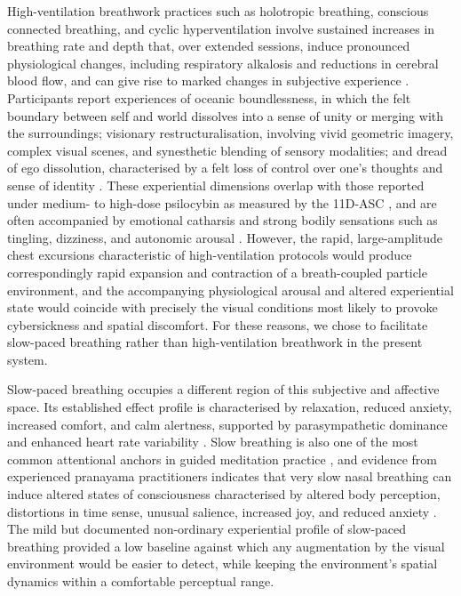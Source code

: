 High-ventilation breathwork practices such as holotropic breathing, conscious connected breathing, and cyclic hyperventilation involve sustained increases in breathing rate and depth that, over extended sessions, induce pronounced physiological changes, including respiratory alkalosis and reductions in cerebral blood flow, and can give rise to marked changes in subjective experience \citep{lewis2024breathwork, Kartar2025, fincham2024effects}. Participants report experiences of oceanic boundlessness, in which the felt boundary between self and world dissolves into a sense of unity or merging with the surroundings; visionary restructuralisation, involving vivid geometric imagery, complex visual scenes, and synesthetic blending of sensory modalities; and dread of ego dissolution, characterised by a felt loss of control over one's thoughts and sense of identity \citep{bahi2024effects, havenith2025decreased, lewis2024breathwork}. These experiential dimensions overlap with those reported under medium- to high-dose psilocybin as measured by the 11D-ASC \citep{studerus2010, havenith2025decreased}, and are often accompanied by emotional catharsis and strong bodily sensations such as tingling, dizziness, and autonomic arousal \citep{havenith2025decreased, lewis2024breathwork, fincham2024effects, fincham2026airways}. However, the rapid, large-amplitude chest excursions characteristic of high-ventilation protocols would produce correspondingly rapid expansion and contraction of a breath-coupled particle environment, and the accompanying physiological arousal and altered experiential state would coincide with precisely the visual conditions most likely to provoke cybersickness and spatial discomfort. For these reasons, we chose to facilitate slow-paced breathing rather than high-ventilation breathwork in the present system.

Slow-paced breathing occupies a different region of this subjective and affective space. Its established effect profile is characterised by relaxation, reduced anxiety, increased comfort, and calm alertness, supported by parasympathetic dominance and enhanced heart rate variability \citep{zaccaro2018breath, Balban2023, fincham2023effect}. Slow breathing is also one of the most common attentional anchors in guided meditation practice \citep{Gerritsen2018, zaccaro2018breath}, and evidence from experienced pranayama practitioners indicates that very slow nasal breathing can induce altered states of consciousness characterised by altered body perception, distortions in time sense, unusual salience, increased joy, and reduced anxiety \citep{zaccaro2022neural}. The mild but documented non-ordinary experiential profile of slow-paced breathing provided a low baseline against which any augmentation by the visual environment would be easier to detect, while keeping the environment's spatial dynamics within a comfortable perceptual range.

